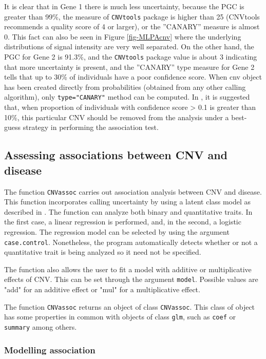 \documentclass[11pt]{article}
\begin{document}
%
It is clear that in Gene 1 there is much less uncertainty, because the PGC is greater than 99\%, the measure of \texttt{CNVtools}
package is higher than 25 (CNVtools recommends a quality score of 4 or larger), or the ''CANARY'' measure is almost 0.
This fact can also be seen in Figure \ref{fig-MLPAcnv} where the underlying distributions of signal intensity are very well separated. 
On the other hand, the PGC for Gene 2 is 91.3\%, and the \texttt{CNVtools} package value is about 3 indicating that more uncertainty 
is present, and the ''CANARY'' type measure for Gene 2 tells that up to 30\% of individuals have a poor confidence score.
When cnv object has been created directly from probabilities (obtained from any other calling algorithm), only {\tt type="CANARY"} method 
can be computed. In \cite{Migen}, it is suggested that, when proportion of individuals with confidence score > 0.1 is greater than 10\%, 
this particular CNV should be removed from the analysis under a best-guess strategy in performing the association test.


\subsection{Assessing associations between CNV and disease}

The function \texttt{CNVassoc} carries out association analysis between CNV and disease. This function incorporates calling uncertainty 
by using a latent class model as described in \cite{GonSubEsc09}. The function can analyze both binary and quantitative traits. 
In the first case, a linear regression is performed, and, in the second, a logistic regression. The regression model can be selected by using 
the argument \texttt{case.control}. Nonetheless, the program automatically detects whether or not a quantitative trait is being analyzed so 
it need not be specified.

The function also allows the user to fit a model with additive or  multiplicative effects of CNV. This can be set through the argument 
\texttt{model}. Possible values are "add" for an additive effect or "mul" for a multiplicative effect.

The function \texttt{CNVassoc} returns an object of class {\tt CNVassoc}. This class of object has some properties in common with 
objects of class {\tt glm}, such as \texttt{coef} or \texttt{summary} among others.


\subsubsection{Modelling association}
\end{document}
